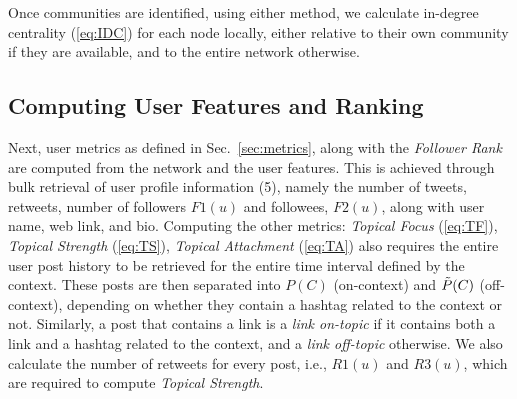%



Once communities are identified, using either method, we calculate  in-degree centrality (\ref{eq:IDC}) for each node locally, either relative to their own community if they are available, and to the entire network otherwise.

\subsection{Computing User Features and Ranking} \label{sec:features}

Next, user metrics as defined in Sec.~\ref{sec:metrics}, along with the \textit{Follower Rank} are computed from the network and the user features.
%
This is achieved through bulk retrieval of user profile information (5), namely the number of tweets, retweets,  number of followers $F1(u)$ and followees, $F2(u)$, along with user name, web link, and bio.
%
Computing the other metrics: \textit{Topical Focus} (\ref{eq:TF}), \textit{Topical Strength} (\ref{eq:TS}), \textit{Topical Attachment} (\ref{eq:TA}) also requires the entire user post history to be retrieved for the entire time interval defined by the context.
These posts are then separated into $P(C)$ (on-context) and $\Tilde{P}(C)$ (off-context), depending on whether they contain a hashtag related to the context or not.
Similarly, a post that contains a link is a \textit{link on-topic} if it contains both a link and a hashtag related to the context, and a \textit{link off-topic} otherwise.
We also calculate the number of retweets for every post, i.e., $\mathit{R1}(u)$ and $\mathit{R3}(u)$, which are required to compute \textit{Topical Strength}.

